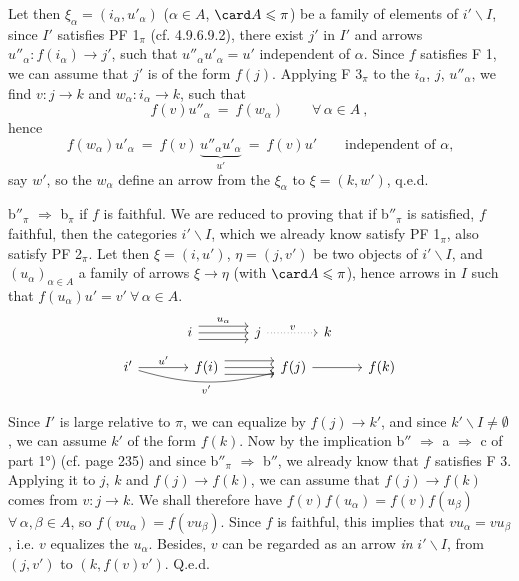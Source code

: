 Let then $\xi_\alpha = (i_\alpha, u'_\alpha)$ ($\alpha \in A$, $\card A \leqslant \pi$) be a family of elements of $i'\backslash I$, since $I'$ satisfies PF 1$_\pi$ (cf. 4.9.6.9.2), there exist $j'$ in $I'$ and arrows $u''_\alpha : f(i_\alpha) \longrightarrow j'$, such that $u''_\alpha u'_\alpha = u'$ independent of $\alpha$. Since $f$ satisfies F 1, we can assume that $j'$ is of the form $f(j)$. Applying F 3$_\pi$ to the $i_\alpha$, $j$, $u''_\alpha$, we find $v : j \longrightarrow k$ and $w_\alpha : i_\alpha \longrightarrow k$, such that
\[
f(v)u''_\alpha \ = \ f(w_\alpha) \qquad \forall\, \alpha \in A \ ,
\]
hence
\[
f(w_\alpha)u'_\alpha \ = \ f(v)\,\underbrace{u''_\alpha u'_\alpha}_{u'} \ = \ f(v)u' \qquad \text{independent of $\alpha$,}
\]
say $w'$, so the $w_\alpha$ define an arrow from the $\xi_\alpha$ to $\xi = (k, w')$, q.e.d.

b$''_\pi$ $\Longrightarrow$ b$_\pi$ if $f$ is faithful. We are reduced to proving that if b$''_\pi$ is satisfied, $f$ faithful, then the categories $i'\backslash I$, which we already know satisfy PF 1$_\pi$, also satisfy PF 2$_\pi$. Let then $\xi = (i, u')$, $\eta = (j, v')$ be two objects of $i'\backslash I$, and $(u_\alpha)_{\alpha\in A}$ a family of arrows $\xi \longrightarrow \eta$ (with $\card A \leqslant \pi$), hence arrows in $I$ such that $f(u_\alpha)u' = v' \ \forall\, \alpha \in A$.
\[
\begin{tikzcd}[column sep=large]
i \arrow[r, shift left=2, "u_\alpha"] \arrow[r] \arrow[r, shift right=2] & j \arrow[r, dotted, "v"] & k
\end{tikzcd}
\]
\[
\begin{tikzcd}[column sep=large]
i' \arrow[r, "u'"] \arrow[rr, bend right=15, "v'"'] & f(i) \arrow[r, shift left=2] \arrow[r] \arrow[r, shift right=2] & f(j) \arrow[r] & f(k)
\end{tikzcd}
\]

Since $I'$ is large relative to $\pi$, we can equalize by $f(j) \longrightarrow k'$, and since $k'\backslash I \neq \emptyset$, we can assume $k'$ of the form $f(k)$. Now
by the implication b$''$ $\Longrightarrow$ a $\Longrightarrow$ c of part 1°) (cf. page 235) and since b$''_\pi$ $\Longrightarrow$ b$''$, we already know that $f$ satisfies F 3. Applying it to $j$, $k$ and $f(j) \longrightarrow f(k)$, we can
assume that $f(j) \longrightarrow f(k)$ comes from $v : j \longrightarrow k$. We shall therefore have $f(v)f(u_\alpha) = f(v)f(u_\beta)$ $\forall\, \alpha, \beta \in A$, so $f(vu_\alpha) = f(vu_\beta)$. Since $f$ is faithful, this implies that $vu_\alpha = vu_\beta$, i.e. $v$ equalizes the $u_\alpha$. Besides, $v$ can be regarded as an arrow \textit{in} $i'\backslash I$, from $(j, v')$ to $(k, f(v)v')$. Q.e.d.

